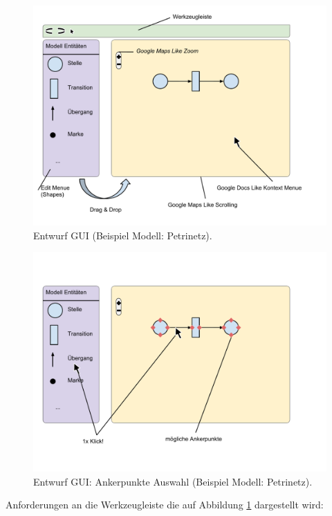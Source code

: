\begin{figure}[h!]
  \centering
  \includegraphics[width=1.0\textwidth]{Figures/Entwurf_GUI.pdf}
  \caption{Entwurf GUI (Beispiel Modell: Petrinetz).}\label{fig.gui}
\end{figure}

\begin{figure}[h!]
  \centering
  \includegraphics[width=1.0\textwidth]{Figures/Entwurf_GUI_Anker.pdf}
  \caption{Entwurf GUI: Ankerpunkte Auswahl (Beispiel Modell: Petrinetz).}\label{fig.guiAnker}
\end{figure}

\noindent Anforderungen an die Werkzeugleiste die auf Abbildung
\ref{fig.gui} dargestellt wird:


